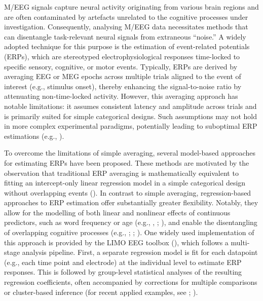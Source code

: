 \documentclass[
  doc,
  floatsintext,
  longtable,
  a4paper,
  nolmodern,
  notxfonts,
  notimes,
  colorlinks=true,linkcolor=blue,citecolor=blue,urlcolor=blue]{apa7}
\begin{document}
M/EEG signals capture neural activity originating from various brain
regions and are often contaminated by artefacts unrelated to the
cognitive processes under investigation. Consequently, analysing M/EEG
data necessitates methods that can disentangle task-relevant neural
signals from extraneous ``noise.'' A widely adopted technique for this
purpose is the estimation of event-related potentials (ERPs), which are
stereotyped electrophysiological responses time-locked to specific
sensory, cognitive, or motor events. Typically, ERPs are derived by
averaging EEG or MEG epochs across multiple trials aligned to the event
of interest (e.g., stimulus onset), thereby enhancing the
signal-to-noise ratio by attenuating non-time-locked activity. However,
this averaging approach has notable limitations: it assumes consistent
latency and amplitude across trials and is primarily suited for simple
categorical designs. Such assumptions may not hold in more complex
experimental paradigms, potentially leading to suboptimal ERP
estimations (e.g., ).

To overcome the limitations of simple averaging, several model-based
approaches for estimating ERPs have been proposed. These methods are
motivated by the observation that traditional ERP averaging is
mathematically equivalent to fitting an intercept-only linear regression
model in a simple categorical design without overlapping events
(). In contrast to
simple averaging, regression-based approaches to ERP estimation offer
substantially greater flexibility. Notably, they allow for the modelling
of both linear and nonlinear effects of continuous predictors, such as
word frequency or age (e.g., , ;
), and enable the
disentangling of overlapping cognitive processes (e.g.,
;
;
). One
widely used implementation of this approach is provided by the LIMO EEG
toolbox (), which follows
a multi-stage analysis pipeline. First, a separate regression model is
fit for each datapoint (e.g., each time point and electrode) at the
individual level to estimate ERP responses. This is followed by
group-level statistical analyses of the resulting regression
coefficients, often accompanied by corrections for multiple comparisons
or cluster-based inference (for recent applied examples, see
;
).
\end{document}
